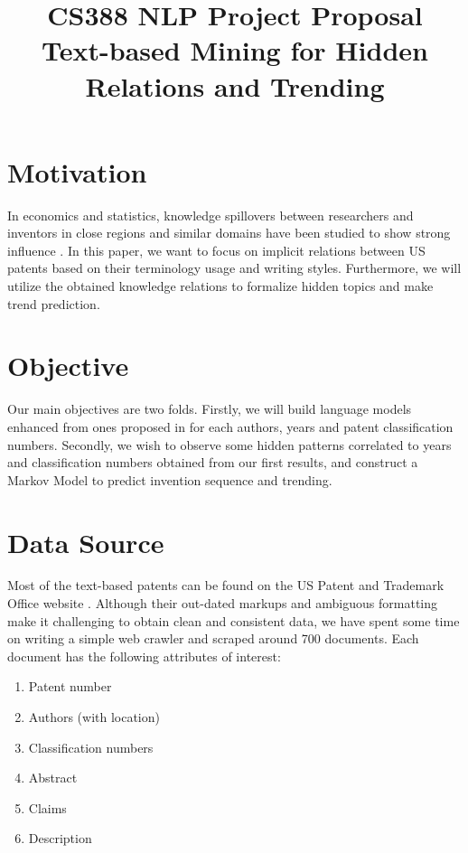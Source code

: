 \documentclass[conference]{IEEEtran}
\begin{document}
\title{\large{CS388 NLP Project Proposal}\\ \huge{Text-based Mining for Hidden Relations and Trending}}

\author{
\and
{}
}
\maketitle

\section{Motivation}
In economics and statistics, knowledge spillovers between researchers and inventors in close regions and similar domains have been studied to show strong influence \cite{Spillover1} \cite{Spillover2}. In this paper, we want to focus on implicit relations between US patents based on their terminology usage and writing styles. Furthermore, we will utilize the obtained knowledge relations to formalize hidden topics and make trend prediction.

\section{Objective}

Our main objectives are two folds. Firstly, we will build language models enhanced from ones proposed in \cite{Authorship} for each authors, years and patent classification numbers. Secondly, we wish to observe some hidden patterns correlated to years and classification numbers obtained from our first results, and construct a Markov Model to predict invention sequence and trending.

\section{Data Source}
Most of the text-based patents can be found on the US Patent and Trademark Office website \cite{uspto}. Although their out-dated markups and ambiguous formatting make it challenging to obtain clean and consistent data, we have spent some time on writing a simple web crawler and scraped around 700 documents. Each document has the following attributes of interest: 
\begin{enumerate}
\item Patent number
\item Authors (with location)
\item Classification numbers
\item Abstract
\item Claims
\item Description
\end{enumerate}
\end{document}
